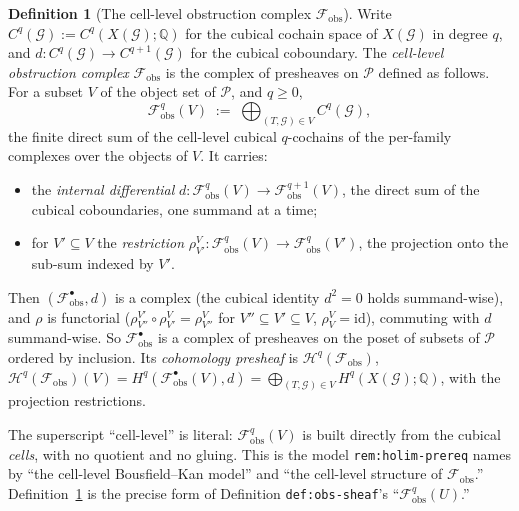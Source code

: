 \documentclass[11pt,oneside]{amsart}
\theoremstyle{plain}
\theoremstyle{definition}
\newtheorem{definition}[theorem]{Definition}
\theoremstyle{remark}
\theoremstyle{honeststyle}
\newcommand{\G}{\mathcal{G}}
\newcommand{\Q}{\mathbb{Q}}
\newcommand{\fobs}{\mathcal{F}_{\mathrm{obs}}}
\newcommand{\Pp}{\mathcal{P}}
\begin{document}
\begin{definition}[The cell-level obstruction complex $\fobs$]
\label{def:fobs}
Write $C^{q}(\G):=C^{q}(X(\G);\Q)$ for the cubical cochain space of
$X(\G)$ in degree $q$, and $d\colon C^{q}(\G)\to C^{q+1}(\G)$ for the
cubical coboundary. The \emph{cell-level obstruction complex} $\fobs$
is the complex of presheaves on $\Pp$ defined as follows. For a subset
$V$ of the object set of $\Pp$, and $q\ge0$,
\[
  \fobs^{q}(V)\;:=\;\bigoplus_{(T,\G)\in V}C^{q}(\G),
\]
the finite direct sum of the cell-level cubical $q$-cochains of the
per-family complexes over the objects of $V$. It carries:
\begin{itemize}[leftmargin=1.6em]
\item the \emph{internal differential} $d\colon\fobs^{q}(V)\to
  \fobs^{q+1}(V)$, the direct sum of the cubical coboundaries,
  one summand at a time;
\item for $V'\subseteq V$ the \emph{restriction}
  $\rho^{V}_{V'}\colon\fobs^{q}(V)\to\fobs^{q}(V')$, the projection
  onto the sub-sum indexed by $V'$.
\end{itemize}
Then $(\fobs^{\bullet},d)$ is a complex (the cubical identity
$d^{2}=0$ holds summand-wise), and $\rho$ is functorial
($\rho^{V'}_{V''}\circ\rho^{V}_{V'}=\rho^{V}_{V''}$ for
$V''\subseteq V'\subseteq V$, $\rho^{V}_{V}=\mathrm{id}$), commuting
with $d$ summand-wise. So $\fobs^{\bullet}$ is a complex of presheaves
on the poset of subsets of $\Pp$ ordered by inclusion. Its
\emph{cohomology presheaf} is $\mathcal H^{q}(\fobs)$,
$\mathcal H^{q}(\fobs)(V)=H^{q}(\fobs^{\bullet}(V),d)=\bigoplus_{(T,\G)
\in V}H^{q}(X(\G);\Q)$, with the projection restrictions.
\end{definition}

The superscript ``cell-level'' is literal: $\fobs^{q}(V)$ is built
directly from the cubical \emph{cells}, with no quotient and no
gluing. This is the model \texttt{rem:holim-prereq} names by ``the
cell-level Bousfield--Kan model'' and ``the cell-level structure of
$\fobs$.'' Definition~\ref{def:fobs} is the precise form of
Definition \texttt{def:obs-sheaf}'s ``$\fobs^{q}(U)$.''
\end{document}
